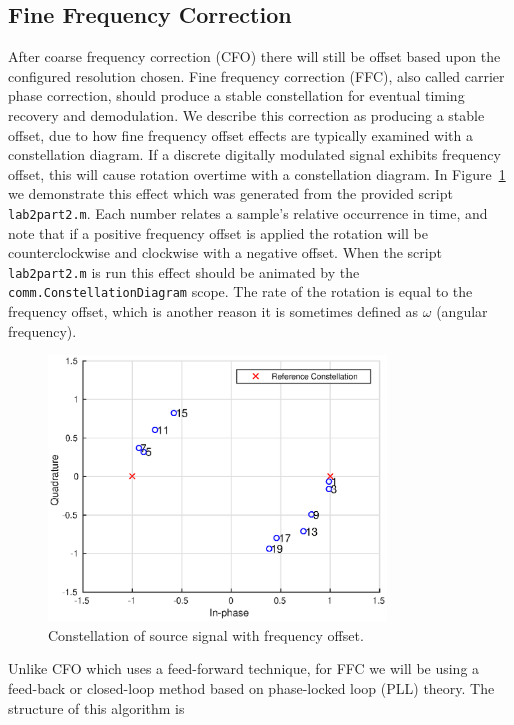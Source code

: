 \documentclass[letterpaper,12pt]{article}
\begin{document}
\subsection{Fine Frequency Correction}\label{sec:ffc}
%
After coarse frequency correction (CFO) there will still be offset based upon the configured resolution 
chosen.  Fine frequency correction (FFC), also called carrier phase correction, should produce a stable 
constellation for eventual timing recovery and demodulation.  We describe this correction as producing a 
stable offset, due to how fine frequency offset effects are typically examined with a constellation diagram.  
If a discrete digitally modulated signal exhibits frequency offset, this will cause rotation overtime with a 
constellation diagram.  In Figure~\ref{fig:fine_freq_offset} we demonstrate this effect which was generated 
from the provided script \texttt{lab2part2.m}.  Each number relates a sample's relative occurrence in time, 
and note that if a positive frequency offset is applied the rotation will be counterclockwise and clockwise 
with a negative offset. When the script \texttt{lab2part2.m} is run this effect should be animated by the 
\texttt{comm.ConstellationDiagram} scope.  The rate of the rotation is equal to the frequency offset, which 
is 
another reason it is sometimes defined as $\omega$ (angular frequency).\par
%
\begin{figure}[!htp]
 \centering
  \includegraphics[width=0.8\textwidth]{fineFreqOffset.eps}
  \caption{Constellation of source signal with frequency offset.}\label{fig:fine_freq_offset}
\end{figure}
%
Unlike CFO which uses a feed-forward technique, for FFC we will be using a 
feed-back or closed-loop method based on phase-locked loop (PLL) theory. The structure of this algorithm is 
\end{document}
